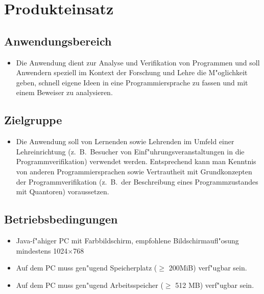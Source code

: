 \section{Produkteinsatz}%

\subsection{Anwendungsbereich}%

\begin{itemize}%
    \item Die Anwendung dient zur Analyse und \see Verifikation von Programmen und soll Anwendern speziell im Kontext der Forschung und Lehre die M"oglichkeit geben, schnell eigene Ideen in eine Programmiersprache zu fassen und mit einem \see Beweiser zu analysieren.%
\end{itemize}%

\subsection{Zielgruppe}%

\begin{itemize}%
    \item Die Anwendung soll von Lernenden sowie Lehrenden im Umfeld einer Lehreinrichtung (z.~B.\ Besucher von Einf"uhrungsveranstaltungen in die Programmverifikation) verwendet werden. Entsprechend kann man Kenntnis von anderen Programmiersprachen sowie Vertrautheit mit Grundkonzepten der Programmverifikation (z.~B.\ der Beschreibung eines \see Programmzustandes mit \see Quantoren) voraussetzen.%
\end{itemize}%

\subsection{Betriebsbedingungen}%

\begin{itemize}%
    \item \see Java-f"ahiger PC mit Farbbildschirm, empfohlene Bildschirmaufl"osung mindestens 1024$\times$768%
    \item Auf dem PC muss gen"ugend Speicherplatz ($\ge$ 200MiB) verf"ugbar sein.%
    \item Auf dem PC muss gen"ugend Arbeitsspeicher ($\ge$ 512 MB) verf"ugbar sein.%
\end{itemize}%
